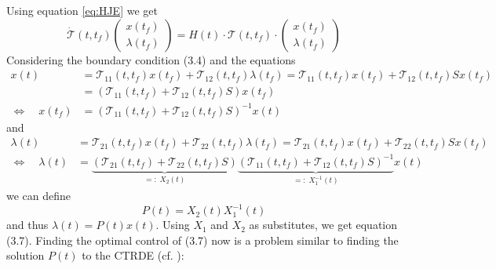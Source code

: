 \documentclass[paper=a4, pagesize, DIV=calc, BCOR=12.5mm, twoside=on, onecolumn=on, open = any, titlepage =on, parskip =half-, headsepline = on, footsepline = on, chapterprefix = on, appendixprefix = off, fontsize = 12pt, numbers = noenddot, abstract = on]{scrbook}
\numberwithin{equation}{chapter}
\theoremstyle{definition}
\theoremstyle{plain}
\theoremstyle{plain}
\theoremstyle{remark}
\theoremstyle{plain}
\theoremstyle{plain}
\begin{document}
Using equation \eqref{eq:HJE} we get
\[
\dot{\mathcal{T}}(t, t_f)
\begin{pmatrix}
x(t_f)\\
\lambda(t_f)
\end{pmatrix}
= H(t) \cdot \mathcal{T}(t, t_f) \cdot 
\begin{pmatrix}
x(t_f)\\
\lambda(t_f)
\end{pmatrix}
\]
Considering the boundary condition (3.4) and the equations
\begin{align*}
x(t) &= \mathcal{T}_{11}(t, t_f)x(t_f) + \mathcal{T}_{12}(t, t_f)\lambda(t_f) = \mathcal{T}_{11}(t, t_f)x(t_f) + \mathcal{T}_{12}(t, t_f)Sx(t_f)\\
&= \left( \mathcal{T}_{11}(t, t_f) + \mathcal{T}_{12}(t, t_f)S \right) x(t_f)\\
\Leftrightarrow \quad x(t_f) &= \left( \mathcal{T}_{11}(t, t_f) + \mathcal{T}_{12}(t, t_f)S \right)^{-1} x(t)
\end{align*}
and
\begin{align*}
\lambda(t) &= \mathcal{T}_{21}(t, t_f) x(t_f) + \mathcal{T}_{22}(t, t_f)\lambda(t_f) =  \mathcal{T}_{21}(t, t_f) x(t_f) + \mathcal{T}_{22}(t, t_f)Sx(t_f)\\
\Leftrightarrow \quad \lambda(t) &= \underbrace{\left( \mathcal{T}_{21}(t, t_f) + \mathcal{T}_{22}(t, t_f)S \right)}_{=: \; X_2(t)}\underbrace{\left( \mathcal{T}_{11}(t, t_f) + \mathcal{T}_{12}(t, t_f)S \right)^{-1}}_{=: \; X_1^{-1}(t)} x(t)
\end{align*}
we can define \begin{equation}
P(t) = X_2(t)X_1^{-1}(t)
\end{equation}
 and thus $\lambda(t) = P(t)x(t)$.
 Using $X_1$ and $X_2$ as substitutes, we get equation (3.7). Finding the optimal control of (3.7) now is a problem similar to finding the solution $P(t)$ to the CTRDE (cf. \cite{bellon:2008}):
\end{document}
